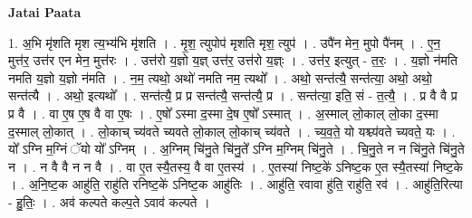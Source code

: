 \documentclass[17pt]{extarticle}
\begin{document}
\textbf{Jatai Paata} \newline

1. अ॒भि मृ॑शति मृश त्य॒भ्य॑भि मृ॑शति । . मृ॒श॒ त्युपोप॑ मृशति मृश॒ त्युप॑ । . उपै॑न मेन॒ मुपो पै॑नम् । . ए॒न॒ मुत्त॑र॒ उत्त॑र एन मेन॒ मुत्त॑रः । . उत्त॑रो य॒ज्ञो य॒ज्ञ् उत्त॑र॒ उत्त॑रो य॒ज्ञ्ः । . उत्त॑र॒ इत्युत् - त॒रः॒ । . य॒ज्ञो न॑मति नमति य॒ज्ञो य॒ज्ञो न॑मति । . न॒म॒ त्यथो॒ अथो॑ नमति नम॒ त्यथो᳚ । . अथो॒ सन्त॑त्यै॒ सन्त॑त्या॒ अथो॒ अथो॒ सन्त॑त्यै । . अथो॒ इत्यथो᳚ । . सन्त॑त्यै॒ प्र प्र सन्त॑त्यै॒ सन्त॑त्यै॒ प्र । . सन्त॑त्या॒ इति॒ सं - त॒त्यै॒ । . प्र वै वै प्र प्र वै । . वा ए॒ष ए॒ष वै वा ए॒षः । . ए॒षो᳚ ऽस्मा द॒स्मा दे॒ष ए॒षो᳚ ऽस्मात् । . अ॒स्माल् लो॒काल् लो॒का द॒स्मा द॒स्माल् लो॒कात् । . लो॒काच् च्य॑वते च्यवते लो॒काल् लो॒काच् च्य॑वते । . च्य॒व॒ते॒ यो यश्च्य॑वते च्यवते॒ यः । . यो᳚ ऽग्नि म॒ग्निं ॅयो यो᳚ ऽग्निम् । . अ॒ग्निम् चि॑नु॒ते चि॑नु॒ते᳚ ऽग्नि म॒ग्निम् चि॑नु॒ते । . चि॒नु॒ते न न चि॑नु॒ते चि॑नु॒ते न । . न वै वै न न वै । . वा ए॒त स्यै॒तस्य॒ वै वा ए॒तस्य॑ । . ए॒तस्या॑ निष्ट॒के॑ ऽनिष्ट॒क ए॒त स्यै॒तस्या॑ निष्ट॒के । . अ॒नि॒ष्ट॒क आहु॑ति॒ राहु॑ति रनिष्ट॒के॑ ऽनिष्ट॒क आहु॑तिः । . आहु॑ति॒ रवावा हु॑ति॒ राहु॑ति॒ रव॑ । . आहु॑ति॒रित्या - हु॒तिः॒ । . अव॑ कल्पते कल्प॒ते ऽवाव॑ कल्पते । \newline
\end{document}
